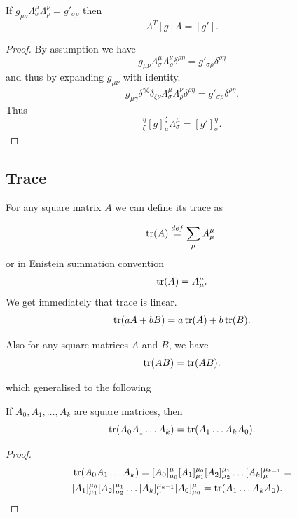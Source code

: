 \documentclass[main.tex]{subfiles}
\begin{document}
\begin{theorem}
\label{skewed-lorentz}
If $g_{\mu\nu} \Lambda^\mu_\sigma \Lambda^\nu_\rho = g'_{\sigma\rho}$ then
\begin{equation}
\Lambda^T [g] \Lambda = [g'].
\end{equation}
\end{theorem}
\begin{proof}
By assumption we have
\begin{equation}
g_{\mu\nu} \Lambda^\mu_\sigma \Lambda^\nu_\rho \delta^{\rho \eta} = g'_{\sigma\rho} \delta^{\rho \eta} 
\end{equation}
and thus by expanding $g_{\mu\nu}$ with identity.
\begin{equation}
g_{\mu\gamma}\delta^{\gamma\zeta}\delta_{\zeta \nu} \Lambda^\mu_\sigma \Lambda^\nu_\rho \delta^{\rho \eta} = g'_{\sigma\rho} \delta^{\rho \eta}.
\end{equation}
Thus
\begin{equation}
[\Lambda^T]^\eta_\zeta [g]_\mu^\zeta \Lambda^\mu_\sigma  = [g']_\sigma^\eta.
\end{equation}
\end{proof}

\subsection{Trace}
\label{trace-properties}
For any square matrix $A$ we can define its trace as 

\begin{equation}
\tr(A) \stackrel{def}{=} \sum_\mu A^\mu_\mu.
\end{equation}
or in Enistein summation convention
\begin{equation}
\tr(A) = A^\mu_\mu.
\end{equation}
We get immediately that trace is linear.
\begin{equation}
\tr(aA + bB) = a\tr(A) + b\tr(B).
\end{equation}

Also for any square matrices $A$ and $B$, we have
\begin{equation}
\tr(AB) = \tr(AB).
\end{equation}

which generalised to the following
\begin{proposition}
If $A_0, A_1, \dots, A_k$ are square matrices, then
\begin{equation}
\tr(A_0 A_1 \dots A_k) = \tr(A_1 \dots A_k A_0).
\end{equation}
\end{proposition}
\begin{proof}
\begin{align*}
& \tr(A_0 A_1 \dots A_k) = [A_0]^\mu_{\mu_0} [A_1]^{\mu_0}_{\mu_1} [A_2]^{\mu_1}_{\mu_2}
\dots [A_k]^{\mu_{k-1}}_\mu = \\
& [A_1]^{\mu_0}_{\mu_1} [A_2]^{\mu_1}_{\mu_2}
\dots [A_k]^{\mu_{k-1}}_\mu [A_0]^\mu_{\mu_0} = \tr(A_1 \dots A_k A_0).
\end{align*}
\end{proof}
\end{document}
